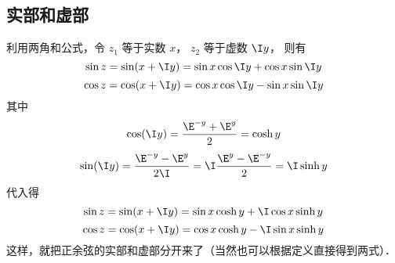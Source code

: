 \subsection{实部和虚部}
利用两角和公式，令 $z_1$ 等于实数 $x$，  $z_2$ 等于虚数 $\I y$， 则有
 \begin{equation}
\sin z = \sin(x + \I y) = \sin x\cos \I y + \cos x\sin \I y
\end{equation} 
\begin{equation}
\cos z = \cos(x + \I y) = \cos x\cos \I y - \sin x\sin \I y
\end{equation} 
其中
\begin{equation}
\cos(\I y) = \frac{\E^{-y} + \E^y}{2} = \cosh y
\end{equation} 
\begin{equation}
\sin(\I y) = \frac{\E^{-y} - \E^y}{2\I} = \I\frac{\E^y - \E^{-y}}{2} = \I\sinh y
\end{equation} 
代入得
\begin{equation}
\sin z = \sin(x + \I y) = \sin x\cosh y + \I\cos x\sinh y
\end{equation} 
\begin{equation}
\cos z = \cos(x + \I y) = \cos x\cosh y - \I\sin x\sinh y
\end{equation}  
这样，就把正余弦的实部和虚部分开来了（当然也可以根据定义直接得到两式）．























